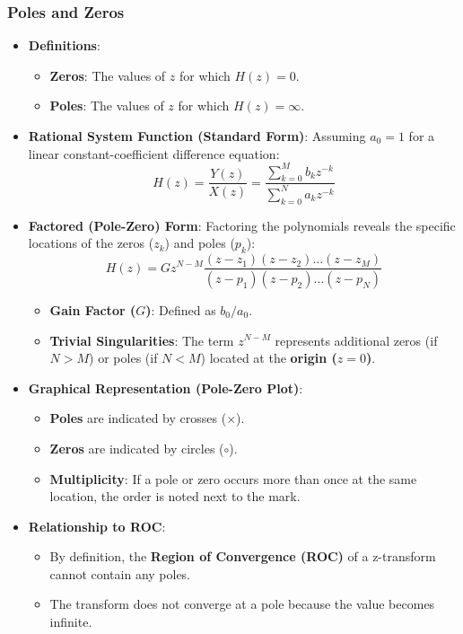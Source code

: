 \subsubsection{Poles and Zeros}\label{poles-and-zeros}

\begin{itemize}
\item
  \textbf{Definitions}:

  \begin{itemize}
  \tightlist
  \item
    \textbf{Zeros}: The values of \(z\) for which \(H(z) = 0\).
  \item
    \textbf{Poles}: The values of \(z\) for which \(H(z) = \infty\).
  \end{itemize}
\item
  \textbf{Rational System Function (Standard Form)}: Assuming
  \(a_0 = 1\) for a linear constant-coefficient difference equation:
  \[H(z) = \frac{Y(z)}{X(z)} = \frac{\sum_{k=0}^{M} b_k z^{-k}}{\sum_{k=0}^{N} a_k z^{-k}}\]
\item
  \textbf{Factored (Pole-Zero) Form}: Factoring the polynomials reveals
  the specific locations of the zeros (\(z_k\)) and poles (\(p_k\)):
  \[H(z) = G z^{N-M} \frac{(z - z_1)(z - z_2) \dots (z - z_M)}{(z - p_1)(z - p_2) \dots (z - p_N)}\]

  \begin{itemize}
  \tightlist
  \item
    \textbf{Gain Factor (\(G\))}: Defined as \(b_0/a_0\).
  \item
    \textbf{Trivial Singularities}: The term \(z^{N-M}\) represents
    additional zeros (if \(N > M\)) or poles (if \(N < M\)) located at
    the \textbf{origin (\(z = 0\))}.
  \end{itemize}
\item
  \textbf{Graphical Representation (Pole-Zero Plot)}:

  \begin{itemize}
  \tightlist
  \item
    \textbf{Poles} are indicated by crosses (\(\times\)).
  \item
    \textbf{Zeros} are indicated by circles (\(\circ\)).
  \item
    \textbf{Multiplicity}: If a pole or zero occurs more than once at
    the same location, the order is noted next to the mark.
  \end{itemize}
\item
  \textbf{Relationship to ROC}:

  \begin{itemize}
  \tightlist
  \item
    By definition, the \textbf{Region of Convergence (ROC)} of a
    z-transform cannot contain any poles.
  \item
    The transform does not converge at a pole because the value becomes
    infinite.
  \end{itemize}
\end{itemize}


